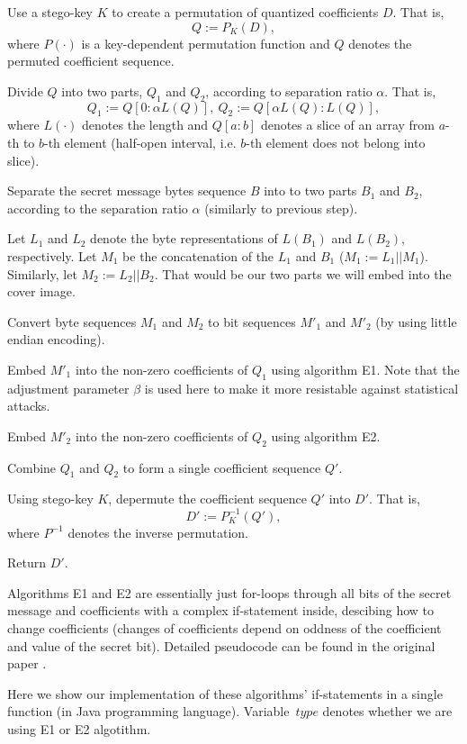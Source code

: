 \begin{Algo}
\item 
Use a stego-key $K$ to create a permutation of quantized coefficients $D$.
That is, $$Q := P_K(D),$$ where $P(\cdot)$ is a key-dependent
permutation function and $Q$ denotes the permuted coefficient sequence.
\item
Divide $Q$ into two parts, $Q_1$ and $Q_2$, according to separation ratio $\alpha$.
That is, $$Q_1 := Q[0 : \alpha L(Q)],~ Q_2 := Q[\alpha L(Q) : L(Q)],$$
where $L(\cdot)$ denotes the length and $Q[a : b]$ denotes a slice of an array from 
$a$-th to $b$-th element (half-open interval, i.e. $b$-th element does not belong into slice).
\item 
Separate the secret message bytes sequence $B$ into to two parts $B_1$ and $B_2$, 
according to the separation ratio $\alpha$ (similarly to previous step).
\item
Let $L_1$ and $L_2$ denote the byte representations of $L(B_1)$ and $L(B_2)$, respectively.
Let $M_1$ be the concatenation of the $L_1$ and $B_1$ ($M_1 := L_1 || M_1$). Similarly, let
$M_2 := L_2 || B_2$. That would be our two parts we will embed into the cover image.
\item
Convert byte sequences $M_1$ and $M_2$ to bit sequences $M'_1$ and $M'_2$ (by using little endian
encoding).
\item
Embed $M'_1$ into the non-zero coefficients of $Q_1$ using algorithm E1. Note that
the adjustment parameter $\beta$ is used here to make it more resistable against statistical attacks.
\item
Embed $M'_2$ into the non-zero coefficients of $Q_2$ using algorithm E2.
\item
Combine $Q_1$ and $Q_2$ to form a single coefficient sequence $Q'$.
\item 
Using stego-key $K$, depermute the coefficient sequence $Q'$ into $D'$. That is,
$$D' := P^{-1}_K(Q'),$$ where $P^{-1}$ denotes the inverse permutation.
\item 
Return $D'$.
\end{Algo}

Algorithms E1 and E2 are essentially just for-loops through all bits of the secret message
and coefficients with a complex if-statement inside, descibing how to change coefficients
(changes of coefficients depend on oddness of the coefficient and
value of the secret bit). Detailed pseudocode can be found in the original paper \cite{liu2008high}.

Here we show our implementation of these algorithms' if-statements 
in a single function (in Java programming language). 
Variable~$type$ denotes whether we are using E1 or E2 algotithm.

